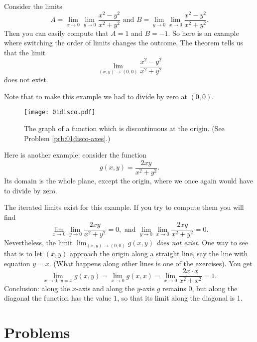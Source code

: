 Consider the limits
\[
A = \lim_{x\to 0}\lim_{y\to 0} \frac{x^2-y^2}{x^2+y^2} \text{ and }
B = \lim_{y\to 0}\lim_{x\to 0} \frac{x^2-y^2}{x^2+y^2}.
\]
Then you can easily compute that $A=1$ and $B=-1$.  So here is an
example where switching the order of limits changes the outcome.  
The theorem tells us that the limit
\[
\lim_{(x, y) \to (0,0)} \frac{x^2-y^2}{x^2+y^2}
\]
does not exist.

Note that to make this example we had to divide by zero at $(0,0)$.

\begin{figure}[ht]\centering
  \texttt{[image: 01disco.pdf]}
  \caption{The graph of a function which is discontinuous at the
  origin. (See Problem \ref {prb:01disco-axes}.)}
  \label{fig:01disco}
\end{figure}

Here is another example: consider the function
\[
g(x, y) = \frac{2xy}{x^2+y^2}.
\]
Its domain is the whole plane, except the origin, where we once again
would have to divide by zero.

The iterated limits exist for this example.  If you try to compute
them you will find
\[
\lim_{x\to 0}\lim_{y\to 0} \frac{2xy}{x^2+y^2} = 0, \text{ and }
\lim_{y\to 0}\lim_{x\to 0} \frac{2xy}{x^2+y^2} = 0 .  
\]
Nevertheless, the limit $\lim_{(x, y) \to (0,0)} g(x, y)$
\emph{does not exist}.  One way to see that is to let $(x, y)$
approach the origin along a straight line, say the line with equation
$y=x$. (What happens along other lines is one of the exercises).
You get
\[
\lim_{x\to 0, \; y=x} g(x, y) =
\lim_{x\to 0} g(x, x) = 
\lim_{x\to 0} \frac{2x\cdot x}{x^2+x^2} = 1.
\]
Conclusion: along the $x$-axis and along the $y$-axis $g$ remains 0, but
along the diagonal the function has the value $1$, so that its limit along
the diagonal is 1.



\section{Problems}   %

